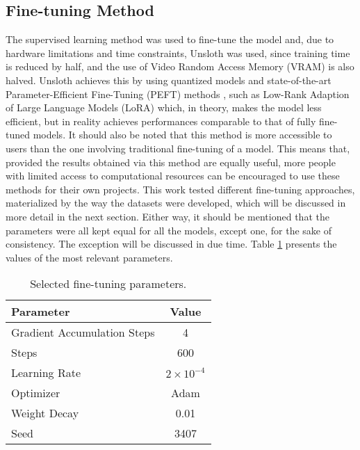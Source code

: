 \documentclass[sigconf]{acmart}
\begin{document}
\subsection{Fine-tuning Method}
The supervised learning method was used to fine-tune the model and, due to hardware limitations and time constraints, Unsloth \cite{Han23} was used, since training time is reduced by half, and the use of Video Random Access Memory (VRAM) is also halved. Unsloth achieves this by using quantized models and state-of-the-art Parameter-Efficient Fine-Tuning (PEFT) methods \cite{Mangrulkar22}, such as Low-Rank Adaption of Large Language Models (LoRA) \cite{Hu21} which, in theory, makes the model less efficient, but in reality achieves performances comparable to that of fully fine-tuned models. It should also be noted that this method is more accessible to users than the one involving traditional fine-tuning of a model. This means that, provided the results obtained via this method are equally useful, more people with limited access to computational resources can be encouraged to use these methods for their own projects. This work tested different fine-tuning approaches, materialized by the way the datasets were developed, which will be discussed in more detail in the next section. Either way, it should be mentioned that the parameters were all kept equal for all the models, except one, for the sake of consistency. The exception will be discussed in due time. Table \ref{tab:params} presents the values of the most relevant parameters.

\begin{table}[h]
  \caption{Selected fine-tuning parameters.}
  \label{tab:params}
  \begin{tabular}{@{}lc@{}}
    \toprule
    \textbf{Parameter} & \textbf{Value} \\
    \midrule
    Gradient Accumulation Steps & 4 \\
    Steps & 600 \\
    Learning Rate & $2 \times 10^{-4}$ \\
    Optimizer & Adam \\
    Weight Decay & 0.01 \\
    Seed & 3407 \\
    \bottomrule
  \end{tabular}
\end{table}
\end{document}
